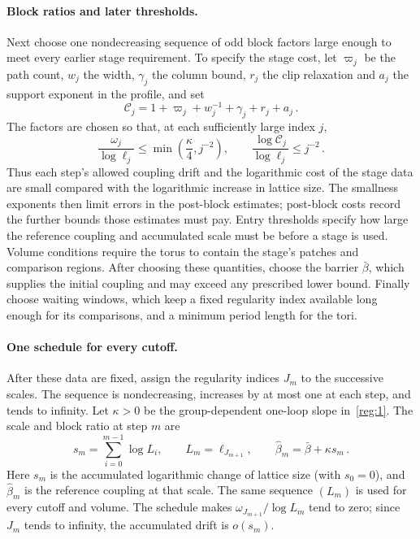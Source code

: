 \paragraph{Block ratios and later thresholds.}
Next choose one nondecreasing sequence of odd block factors large enough to meet every earlier stage requirement. To specify the stage cost, let $\varpi_j$ be the path count, $w_j$ the width, $\gamma_j$ the column bound, $r_j$ the clip relaxation and $a_j$ the support exponent in the profile, and set
\begin{equation}\label{eq:constants-stage-cost}
 \mathcal C_j=1+\varpi_j+w_j^{-1}+\gamma_j+r_j+a_j\,.
\end{equation}
The factors are chosen so that, at each sufficiently large index $j$,
\begin{equation*}
 \frac{\omega_j}{\log\ell_j}\leq\min\left(\frac{\kappa}{4},j^{-2}\right),\qquad
 \frac{\log\mathcal C_j}{\log\ell_j}\leq j^{-2}\,.
\end{equation*}
Thus each step's allowed coupling drift and the logarithmic cost of the stage data are small compared with the logarithmic increase in lattice size. The smallness exponents then limit errors in the post-block estimates; post-block costs record the further bounds those estimates must pay. Entry thresholds specify how large the reference coupling and accumulated scale must be before a stage is used. Volume conditions require the torus to contain the stage's patches and comparison regions. After choosing these quantities, choose the barrier $\bar\beta$, which supplies the initial coupling and may exceed any prescribed lower bound. Finally choose waiting windows, which keep a fixed regularity index available long enough for its comparisons, and a minimum period length for the tori.

\paragraph{One schedule for every cutoff.}
After these data are fixed, assign the regularity indices $J_m$ to the successive scales. The sequence is nondecreasing, increases by at most one at each step, and tends to infinity. Let $\kappa>0$ be the group-dependent one-loop slope in~\ref{reg:1}. The scale and block ratio at step $m$ are
\begin{equation}\label{eq:constants-schedule}
 s_m=\sum_{i=0}^{m-1}\log L_i,\qquad L_m=\ell_{J_{m+1}},\qquad
 \widehat\beta_m=\bar\beta+\kappa s_m\,.
\end{equation}
Here $s_m$ is the accumulated logarithmic change of lattice size (with $s_0=0$), and $\widehat\beta_m$ is the reference coupling at that scale. The same sequence $(L_m)$ is used for every cutoff and volume. The schedule makes $\omega_{J_{m+1}}/\log L_m$ tend to zero; since $J_m$ tends to infinity, the accumulated drift is $o(s_m)$.

